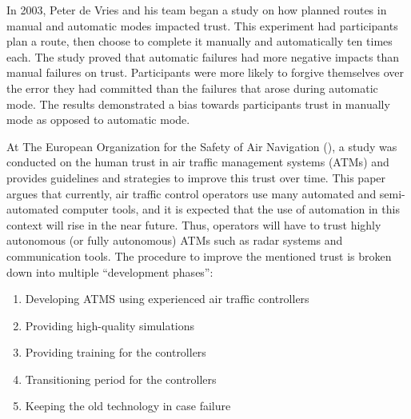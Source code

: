 \documentclass[runningheads,a4paper]{llncs}
\begin{document}
In 2003, Peter de Vries and his team began a study on how planned routes in manual and automatic modes impacted trust\cite{de2003effects}. This experiment had participants plan a route, then choose to complete it manually and automatically ten times each.  The study proved that automatic failures had more negative impacts than manual failures on trust. Participants were more likely to forgive themselves over the error they had committed than the failures that arose during automatic mode. The results demonstrated a bias towards participants trust in manually mode as opposed to automatic mode.

At The European Organization for the Safety of Air Navigation (\cite{kelly2003guidelines}), a study was conducted on the human trust in air traffic management systems (ATMs) and provides guidelines and strategies to improve this trust over time. This paper argues that currently, air traffic control operators use many automated and semi-automated computer tools, and it is expected that the use of automation in this context will rise in the near future. Thus, operators will have to trust highly autonomous (or fully autonomous) ATMs such as radar systems and communication tools. The procedure to improve the mentioned trust is broken down into multiple ``development phases'':

\begin{enumerate}
    \item Developing ATMS using experienced air traffic controllers
    \item Providing high-quality simulations
    \item Providing training for the controllers
    \item Transitioning period for the controllers
    \item Keeping the old technology in case failure
\end{enumerate}
\end{document}
